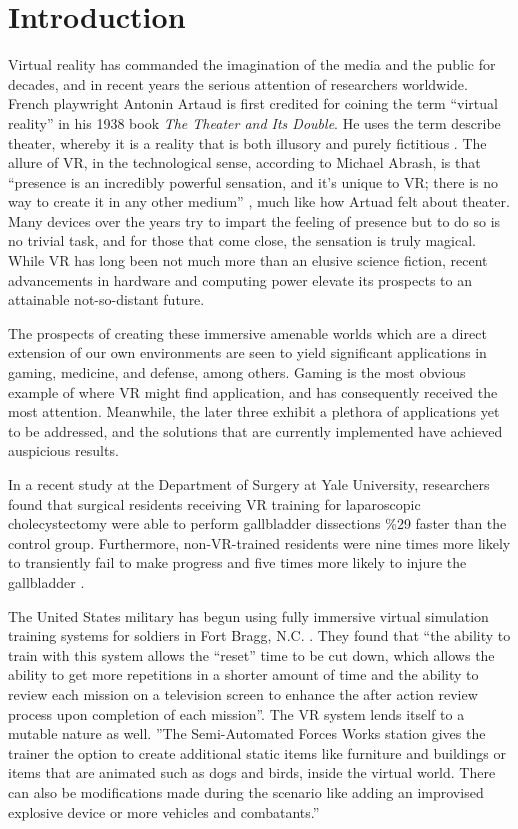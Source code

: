 \section{Introduction}
\label{sec:introduction}

Virtual reality has commanded the imagination of the media and the public for
decades, and in recent years the serious attention of researchers worldwide.
French playwright Antonin Artaud is first credited for coining the term
``virtual reality'' in his 1938 book \emph{The Theater and Its Double}. He uses
the term describe theater, whereby it is a reality that is both illusory and
purely fictitious \cite{website:popularizeVR}. The allure of VR, in the
technological sense, according to Michael Abrash, is that ``presence is an
incredibly powerful sensation, and it's unique to VR; there is no way to create
it in any other medium'' \cite{website:steampowered}, much like how Artuad felt
about theater. Many devices over the years try to impart the feeling of
presence but to do so is no trivial task, and for those that come close, the
sensation is truly magical. While VR has long been not much more than an
elusive science fiction, recent advancements in hardware and computing power
elevate its prospects to an attainable not-so-distant future. 

The prospects of creating these immersive amenable worlds which are a direct
extension of our own environments are seen to yield significant applications in
gaming, medicine, and defense, among others. Gaming is the most obvious example
of where VR might find application, and has consequently received the most
attention. Meanwhile, the later three exhibit a plethora of applications yet to
be addressed, and the solutions that are currently implemented have achieved
auspicious results. 

In a recent study at the Department of Surgery at Yale University, researchers
found that surgical residents receiving VR training for laparoscopic
cholecystectomy were able to perform gallbladder dissections \%29 faster than
the control group. Furthermore, non-VR-trained residents were nine times more
likely to transiently fail to make progress and five times more likely to
injure the gallbladder \cite{seymour2002virtual}.

The United States military has begun using fully immersive virtual simulation
training systems for soldiers in Fort Bragg, N.C. \cite{website:army}. They
found that ``the ability to train with this system allows the ``reset'' time to
be cut down, which allows the ability to get more repetitions in a shorter
amount of time and the ability to review each mission on a television screen to
enhance the after action review process upon completion of each mission''.  The
VR system lends itself to a mutable nature as well. ''The Semi-Automated Forces
Works station gives the trainer the option to create additional static items
like furniture and buildings or items that are animated such as dogs and birds,
inside the virtual world. There can also be modifications made during the
scenario like adding an improvised explosive device or more vehicles and
combatants.''

